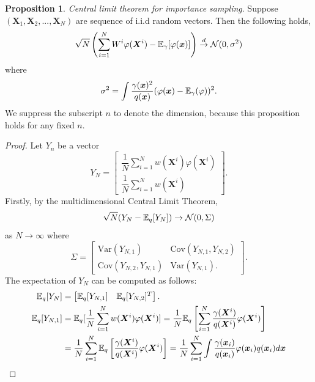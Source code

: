 \documentclass[10pt]{article}
\theoremstyle{definition}
\newtheorem{proposition}{Proposition}
\numberwithin{equation}{section}
\begin{document}
\begin{proposition}
	\textit{Central limit theorem for importance sampling}.  Suppose $(\bm{X}_1, \bm{X}_2, ..., \bm{X}_N)$ are sequence of i.i.d random vectors. Then the following holds,
	\begin{equation}
	\sqrt{N} \left(  \sum_{i=1}^{N} W^i \varphi(\bm{X}^i) - \mathbb{E}_{\gamma}[\varphi(\bm{x})] \right) \overset{d}{\to} \mathcal{N}(0,\sigma^2)
	\end{equation} where 
	\begin{equation}
		\sigma^2 = \int \dfrac{\gamma(\bm{x})^2}{q(\bm{x})} (\varphi(\bm{x}) - \mathbb{E}_{\gamma}(\varphi))^2.
	\end{equation}
	We suppress the subscript $n$ to denote the dimension, because this proposition holds for any fixed $n$. 
	
	\begin{proof}
		Let $Y_n$ be a vector \begin{equation}
		Y_N = \begin{bmatrix}
		\dfrac{1}{N}\sum_{i=1}^{N} w(\bm{X}^i)\varphi(\bm{X}^i) \\
		\dfrac{1}{N}\sum_{i=1}^{N} w(\bm{X}^i)
		\end{bmatrix}.
		\end{equation}
		Firstly, by the multidimensional Central Limit Theorem,
		\begin{equation}
			\sqrt{N}(Y_N - \mathbb{E}_q[Y_N]) \rightarrow \mathcal{N}(0,\Sigma)
		\end{equation} as $N \rightarrow \infty$ where
		\begin{equation}
			\Sigma = \begin{bmatrix}
			\text{Var}(Y_{N,1}) & \text{Cov}(Y_{N,1}, Y_{N,2}) \\ \text{Cov}(Y_{N,2}, Y_{N,1}) & \text{Var}(Y_{N,1}).
			\end{bmatrix}.
		\end{equation} 
		The expectation of $Y_N$ can be computed as follows:
		\begin{align}
			\E_q[Y_N] &= \begin{bmatrix} \E_q[Y_{N,1}] &  \E_q[Y_{N,2}]^T \end{bmatrix}. \\
			\E_q[Y_{N,1}] &=\E_q[	\dfrac{1}{N}\sum_{i=1}^{N} w(\bm{X}^i)\varphi(\bm{X}^i)] =  \dfrac{1}{N}\E_q \left[ \sum_{i=1}^{N} \dfrac{\gamma(\bm{X}^i)}{q(\bm{X}^i)} \varphi(\bm{X}^i)\right]   \\
			&= \dfrac{1}{N}\sum_{i=1}^{N} \E_q \left[ \dfrac{\gamma(\bm{X}^i)}{q(\bm{X}^i)} \varphi(\bm{X}^i) \right] = \dfrac{1}{N} \sum_{i=1}^{N} \int \dfrac{\gamma(\bm{x}_i)}{q(\bm{x}_i)} \varphi(\bm{x}_i) q(\bm{x}_i) d\bm{x} \label{eq:finite} \\

\end{align}
\end{proof}
\end{proposition}
\end{document}
